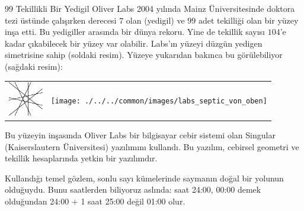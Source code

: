 \begin{surferPage}{99 Tekillikli Bir Yedigil}
    Oliver Labs 2004 yılında Mainz Üniversitesinde doktora tezi üstünde çalışırken  derecesi $7$ olan  (yedigil) ve $99$ adet tekilliği olan bir yüzey inşa etti. Bu yedigiller arasında bir dünya rekoru.
Yine de tekillik sayısı $104$'e kadar çıkabilecek bir yüzey var olabilir.
Labs'ın yüzeyi düzgün yedigen simetrisine sahip (soldaki resim).
Yüzeye yukarıdan bakınca bu görülebiliyor  (sağdaki resim):

    \vspace*{-0.3em}
    \begin{center}
      \begin{tabular}{c@{\qquad}c}
        \includegraphics[height=1.5cm]{./../../common/images/labsseptic1.pdf}
        &
        \texttt{[image: ./../../common/images/labs\_septic\_von\_oben]}
      \end{tabular}
    \end{center}
    \vspace*{-0.3em}

Bu yüzeyin inşasında  Oliver Labs bir bilgisayar cebir sistemi olan
    {\sc Singular} (Kaiserslautern Üniversitesi) yazılımını kullandı. Bu yazılım, cebirsel geometri ve tekillik hesaplarında yetkin bir yazılımdır.

Kullandığı temel gözlem, sonlu sayı kümelerinde saymanın doğal bir yolunun olduğuydu. Bunu saatlerden biliyoruz aslında:   saat 24:00, 00:00 demek olduğundan 24:00 $+$ 1 saat  25:00 değil 01:00 olur.
\end{surferPage}
